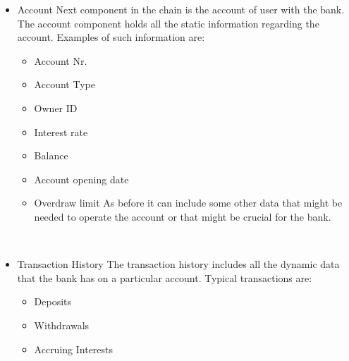 \begin{itemize} 
\item Account 
Next component in the chain is the account of user with the bank. The account component holds all the static information regarding the account. Examples of such information are:
\begin{itemize}
\item Account Nr.
\item Account Type
\item Owner ID
\item Interest rate
\item Balance
\item Account opening date
\item Overdraw limit
As before it can include some other data that might be needed to operate the account or that might be crucial for the bank.
\end{itemize}
\end{itemize} 
\begin{itemize}
\item Transaction History
The transaction history includes all the dynamic data that the bank has on a particular account. Typical transactions are:
\begin{itemize}
\item Deposits
\item Withdrawals
\item Accruing Interests
\end{itemize}
\end{itemize} 
